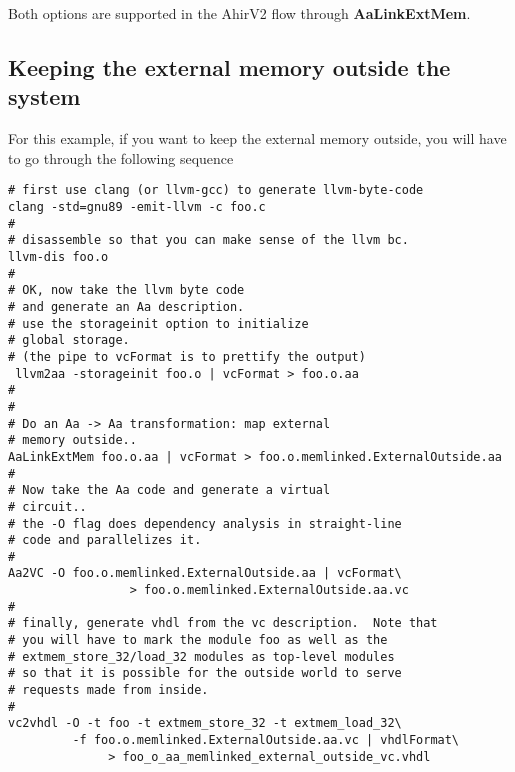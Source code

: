 \documentclass{article}
\begin{document}
Both options are supported in the AhirV2 flow through
{\bf AaLinkExtMem}.


\subsection{Keeping the external memory outside the system}

For this example, if you want to keep the external memory
outside, you will have to go through the following sequence
\begin{verbatim}
# first use clang (or llvm-gcc) to generate llvm-byte-code
clang -std=gnu89 -emit-llvm -c foo.c
#
# disassemble so that you can make sense of the llvm bc.
llvm-dis foo.o
#
# OK, now take the llvm byte code
# and generate an Aa description.
# use the storageinit option to initialize
# global storage.
# (the pipe to vcFormat is to prettify the output)
 llvm2aa -storageinit foo.o | vcFormat > foo.o.aa
#
#
# Do an Aa -> Aa transformation: map external
# memory outside..
AaLinkExtMem foo.o.aa | vcFormat > foo.o.memlinked.ExternalOutside.aa
#
# Now take the Aa code and generate a virtual
# circuit..
# the -O flag does dependency analysis in straight-line
# code and parallelizes it.
#
Aa2VC -O foo.o.memlinked.ExternalOutside.aa | vcFormat\
                 > foo.o.memlinked.ExternalOutside.aa.vc
#
# finally, generate vhdl from the vc description.  Note that
# you will have to mark the module foo as well as the
# extmem_store_32/load_32 modules as top-level modules
# so that it is possible for the outside world to serve
# requests made from inside.
#
vc2vhdl -O -t foo -t extmem_store_32 -t extmem_load_32\ 
         -f foo.o.memlinked.ExternalOutside.aa.vc | vhdlFormat\
              > foo_o_aa_memlinked_external_outside_vc.vhdl

\end{verbatim}
\end{document}
